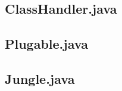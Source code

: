 \documentclass[a4paper, 12pt]{article}
\begin{document}
\subsection{ClassHandler.java}
\begin{footnotesize}

\end{footnotesize}

\subsection{Plugable.java}
\begin{footnotesize}

\end{footnotesize}

\subsection{Jungle.java}
\begin{footnotesize}

\end{footnotesize}
\end{document}
